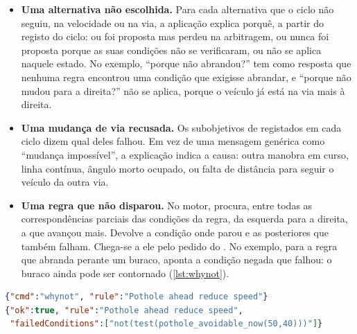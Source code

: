 \begin{itemize}
  \item \textbf{Uma alternativa não escolhida.} Para cada alternativa que o
    ciclo não seguiu, na velocidade ou na via, a aplicação explica porquê, a
    partir do registo do ciclo: ou foi proposta mas perdeu na arbitragem, ou nunca
    foi proposta porque as suas condições não se verificaram, ou não se aplica
    naquele estado. No exemplo, \enquote{porque não abrandou?} tem como resposta que
    nenhuma regra encontrou uma condição que exigisse abrandar, e
    \enquote{porque não mudou para a direita?} não se aplica, porque o veículo
    já está na via mais à direita.
  \item \textbf{Uma mudança de via recusada.} Os subobjetivos de
     registados em cada ciclo dizem qual deles
    falhou. Em vez de uma mensagem genérica como \enquote{mudança impossível}, a
    explicação indica a causa: outra manobra em curso, linha contínua, ângulo
    morto ocupado, ou falta de distância para seguir o veículo da outra via.
  \item \textbf{Uma regra que não disparou.} No motor,  procura,
    entre todas as correspondências parciais das condições da regra, da esquerda
    para a direita, a que avançou mais. Devolve a condição onde parou e as
    posteriores que também falham. Chega-se a ele pelo pedido  do . No
    exemplo, para a regra que abranda perante um buraco, aponta a condição
    negada que falhou: o buraco ainda pode ser contornado (\cref{lst:whynot}).
\end{itemize}

\begin{lstlisting}[language=JSON,caption={Pedido \texttt{whynot} e resposta do \texttt{server.pl} no exemplo},label=lst:whynot]
{"cmd":"whynot", "rule":"Pothole ahead reduce speed"}
{"ok":true, "rule":"Pothole ahead reduce speed",
 "failedConditions":["not(test(pothole_avoidable_now(50,40)))"]}
\end{lstlisting}
